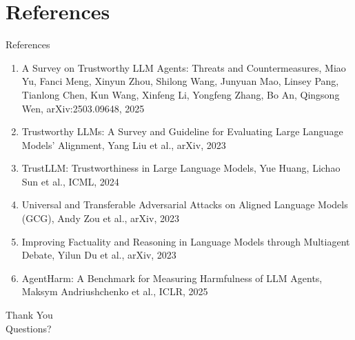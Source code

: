 \documentclass[10pt]{beamer}
\begin{document}
\section{References}
\begin{frame}[allowframebreaks]{References}
  \footnotesize
  \begin{enumerate}
    \item A Survey on Trustworthy LLM Agents: Threats and Countermeasures, Miao Yu, Fanci Meng, Xinyun Zhou, Shilong Wang, Junyuan Mao, Linsey Pang, Tianlong Chen, Kun Wang, Xinfeng Li, Yongfeng Zhang, Bo An, Qingsong Wen, arXiv:2503.09648, 2025
    \item Trustworthy LLMs: A Survey and Guideline for Evaluating Large Language Models' Alignment, Yang Liu et al., arXiv, 2023
    \item TrustLLM: Trustworthiness in Large Language Models, Yue Huang, Lichao Sun et al., ICML, 2024
    \item Universal and Transferable Adversarial Attacks on Aligned Language Models (GCG), Andy Zou et al., arXiv, 2023
    \item Improving Factuality and Reasoning in Language Models through Multiagent Debate, Yilun Du et al., arXiv, 2023
    \item AgentHarm: A Benchmark for Measuring Harmfulness of LLM Agents, Maksym Andriushchenko et al., ICLR, 2025
  \end{enumerate}
\end{frame}

\begin{frame}[plain]
  \begin{center}
    {\Huge Thank You}\\[1em]
    {\large Questions?}
  \end{center}
\end{frame}
\end{document}
